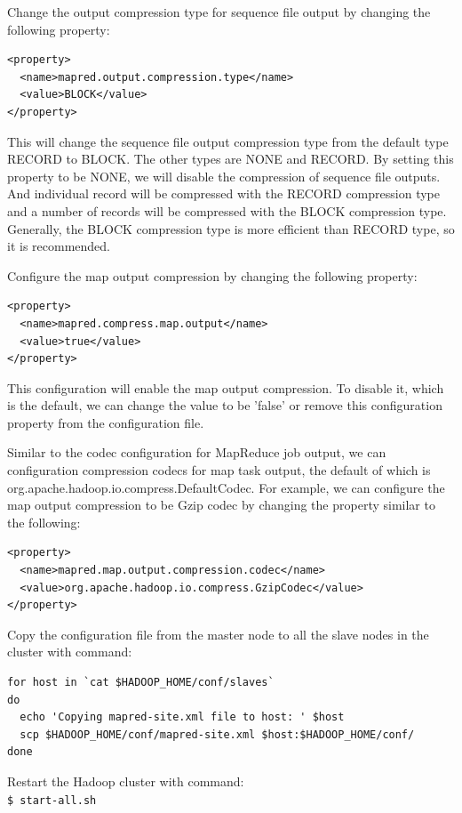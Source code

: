 Change the output compression type for sequence file output by changing the following property:
\lstset{style=bashstyle}
\begin{lstlisting}
<property>
  <name>mapred.output.compression.type</name>
  <value>BLOCK</value>
</property>
\end{lstlisting}
This will change the sequence file output compression type from the default type RECORD to BLOCK. The other types are NONE and RECORD. By setting this property to be NONE, we will disable the compression of sequence file outputs. And individual record will be compressed with the RECORD compression type and a number of records will be compressed with the BLOCK compression type. Generally, the BLOCK compression type is more efficient than RECORD type, so it is recommended.

Configure the map output compression by changing the following property:
\lstset{style=bashstyle}
\begin{lstlisting}
<property>
  <name>mapred.compress.map.output</name>
  <value>true</value>
</property>
\end{lstlisting}
This configuration will enable the map output compression. To disable it, which is the default, we can change the value to be 'false' or remove this configuration property from the configuration file.


Similar to the codec configuration for MapReduce job output, we can configuration compression codecs for map task output, the default of which is org.apache.hadoop.io.compress.DefaultCodec. For example, we can configure the map output compression to be Gzip codec by changing the property similar to the following:
\lstset{style=bashstyle}
\begin{lstlisting}
<property>
  <name>mapred.map.output.compression.codec</name>
  <value>org.apache.hadoop.io.compress.GzipCodec</value>
</property>
\end{lstlisting}

Copy the configuration file from the master node to all the slave nodes in the cluster with command:
\lstset{style=bashstyle}
\begin{lstlisting}
for host in `cat $HADOOP_HOME/conf/slaves`
do
  echo 'Copying mapred-site.xml file to host: ' $host
  scp $HADOOP_HOME/conf/mapred-site.xml $host:$HADOOP_HOME/conf/
done
\end{lstlisting}

Restart the Hadoop cluster with command: \\
\verb|$ start-all.sh|

